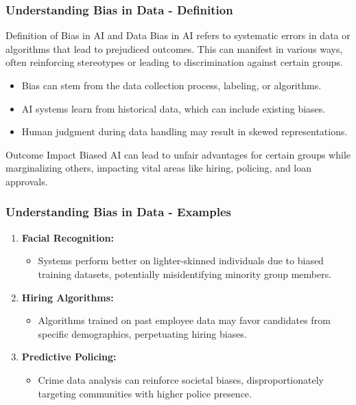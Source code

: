 \documentclass[aspectratio=169]{beamer}
\begin{document}
\begin{frame}[fragile]
    \frametitle{Understanding Bias in Data - Definition}
    \begin{block}{Definition of Bias in AI and Data}
        Bias in AI refers to systematic errors in data or algorithms that lead to prejudiced outcomes. This can manifest in various ways, often reinforcing stereotypes or leading to discrimination against certain groups.
    \end{block}
    
    \begin{itemize}
        \item Bias can stem from the data collection process, labeling, or algorithms.
        \item AI systems learn from historical data, which can include existing biases.
        \item Human judgment during data handling may result in skewed representations.
    \end{itemize}
    
    \begin{block}{Outcome Impact}
        Biased AI can lead to unfair advantages for certain groups while marginalizing others, impacting vital areas like hiring, policing, and loan approvals.
    \end{block}
\end{frame}

\begin{frame}[fragile]
    \frametitle{Understanding Bias in Data - Examples}
    \begin{enumerate}
        \item \textbf{Facial Recognition:}
            \begin{itemize}
                \item Systems perform better on lighter-skinned individuals due to biased training datasets, potentially misidentifying minority group members.
            \end{itemize}
            
        \item \textbf{Hiring Algorithms:}
            \begin{itemize}
                \item Algorithms trained on past employee data may favor candidates from specific demographics, perpetuating hiring biases.
            \end{itemize}
            
        \item \textbf{Predictive Policing:}
            \begin{itemize}
                \item Crime data analysis can reinforce societal biases, disproportionately targeting communities with higher police presence.
            \end{itemize}
    \end{enumerate}
\end{frame}
\end{document}

